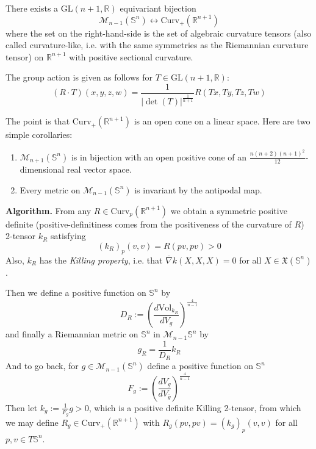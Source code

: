 \begin{theorem}
\label{theorem-equivariant-bijection}
There exists a $\text{GL}(n+1,\mathbb{R})$ equivariant bijection
$$
\mathcal{M}_{n-1}(\mathbb{S}^n)\leftrightarrow \text{Curv}_+(\mathbb{R}^{n+1})
$$
where the set on the right-hand-side is the set of algebraic curvature tensors
(also called curvature-like, i.e. with the same symmetries as the Riemannian
curvature tensor) on $\mathbb{R}^{n+1}$ with positive sectional curvature.

The group action is given as follows for $T\in\text{GL}(n+1,\mathbb{R})$:
$$
(R\cdot T)(x,y,z,w)=\frac{1}{|\det(T)|^{\frac{1}{n+1}}}R(Tx,Ty,Tz,Tw)
$$
\end{theorem}

The point is that $\text{Curv}_+(\mathbb{R}^{n+1})$ is an open cone on a linear
space. Here are two simple corollaries:

\begin{lemma}
\label{lemma-corollaries}
\begin{enumerate}
\item $\mathcal{M}_{n+1}(\mathbb{S}^n)$ is in bijection with an open positive
cone of an $\frac{n(n+2)(n+1)^2}{12}$-dimensional real vector space.
\item Every metric on $\mathcal{M}_{n-1}(\mathbb{S}^n)$ is invariant by the
antipodal map.
\end{enumerate}
\end{lemma}

{\bf Algorithm.} From any $R\in \text{Curv}_p(\mathbb{R}^{n+1})$ we obtain a
symmetric positive definite (positive-definitiness comes from the positiveness
of the curvature of $R$) 2-tensor  $k_R$ satisfying
$$
(k_R)_p(v,v)=R(pv,pv)>0
$$
Also, $k_R$ has the  {\it Killing property},
i.e. that $\overline{\nabla}k(X,X,X)=0$ for all
$X\in\mathfrak{X}(\mathbb{S}^n)$.

Then we define a positive function on
 $\mathbb{S}^n$ by
\begin{equation}
\label{equation-def-DR}
D_R:=\left(\frac{d\text{Vol}_{k_R}}{dV_g}\right)^{\frac{4}{n-1}}
\end{equation}
and finally a Riemannian metric on $\mathbb{S}^n$ in
$\mathcal{M}_{n-1}\mathbb{S}^n$ by
$$
g_R=\frac{1}{D_R}k_R
$$
And to go back, for $g \in \mathcal{M}_{n-1}(\mathbb{S}^n)$ define a positive 
function on $\mathbb{S}^n$
$$
F_g:=\left(\frac{dV_g}{dV_{\overline{g}}}\right)^{\frac{4}{n-1}}
$$
Then let $k_g:=\frac{1}{F_g}g>0$, which is a positive definite Killing 2-tensor,
from which we may define $R_g\in\text{Curv}_+(\mathbb{R}^{n+1})$ with
$R_g(pv,pv)=(k_g)_p(v,v)$ for all $p,v\in T\mathbb{S}^n$.

